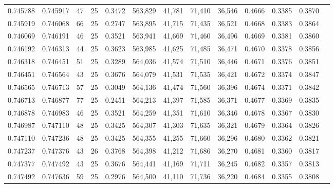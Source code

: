 \begin{tabular}{rrrrrrrrrrrrr}
0.745788 & 0.745917 &    47 &  25 &                                     0.3472 & 563,829 &  41,781 &  71,410 &  36,546 & 0.4666 & 0.3385 & 0.3870 \\
0.745919 & 0.746068 &    66 &  25 &                                     0.2747 & 563,895 &  41,715 &  71,435 &  36,521 & 0.4668 & 0.3383 & 0.3864 \\
0.746069 & 0.746191 &    46 &  25 &                                     0.3521 & 563,941 &  41,669 &  71,460 &  36,496 & 0.4669 & 0.3381 & 0.3860 \\
0.746192 & 0.746313 &    44 &  25 &                                     0.3623 & 563,985 &  41,625 &  71,485 &  36,471 & 0.4670 & 0.3378 & 0.3856 \\
0.746318 & 0.746451 &    51 &  25 &                                     0.3289 & 564,036 &  41,574 &  71,510 &  36,446 & 0.4671 & 0.3376 & 0.3851 \\
0.746451 & 0.746564 &    43 &  25 &                                     0.3676 & 564,079 &  41,531 &  71,535 &  36,421 & 0.4672 & 0.3374 & 0.3847 \\
0.746565 & 0.746713 &    57 &  25 &                                     0.3049 & 564,136 &  41,474 &  71,560 &  36,396 & 0.4674 & 0.3371 & 0.3842 \\
0.746713 & 0.746877 &    77 &  25 &                                     0.2451 & 564,213 &  41,397 &  71,585 &  36,371 & 0.4677 & 0.3369 & 0.3835 \\
0.746878 & 0.746983 &    46 &  25 &                                     0.3521 & 564,259 &  41,351 &  71,610 &  36,346 & 0.4678 & 0.3367 & 0.3830 \\
0.746987 & 0.747110 &    48 &  25 &                                     0.3425 & 564,307 &  41,303 &  71,635 &  36,321 & 0.4679 & 0.3364 & 0.3826 \\
0.747110 & 0.747236 &    48 &  25 &                                     0.3425 & 564,355 &  41,255 &  71,660 &  36,296 & 0.4680 & 0.3362 & 0.3821 \\
0.747237 & 0.747376 &    43 &  26 &                                     0.3768 & 564,398 &  41,212 &  71,686 &  36,270 & 0.4681 & 0.3360 & 0.3817 \\
0.747377 & 0.747492 &    43 &  25 &                                     0.3676 & 564,441 &  41,169 &  71,711 &  36,245 & 0.4682 & 0.3357 & 0.3813 \\
0.747492 & 0.747636 &    59 &  25 &                                     0.2976 & 564,500 &  41,110 &  71,736 &  36,220 & 0.4684 & 0.3355 & 0.3808 \\

\end{tabular}
